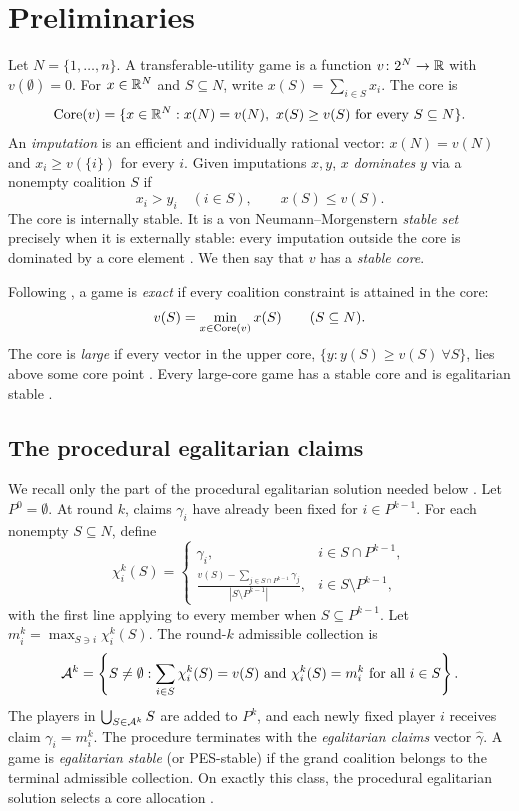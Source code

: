 \section{Preliminaries}\label{sec:prelim}

Let $N=\{1,\dots,n\}$. A transferable-utility game is a function
$v\colon 2^N\to\mathbb{R}$ with $v(\emptyset)=0$. For $x\in\mathbb{R}^N$ and $S\subseteq N$,
write $x(S)=\sum_{i\in S}x_i$. The core is
\[
 \operatorname{Core}(v)=
 \{x\in\mathbb{R}^N:x(N)=v(N),\ x(S)\ge v(S)\text{ for every }S\subseteq N\}.
\]
An \emph{imputation} is an efficient and individually rational vector:
$x(N)=v(N)$ and $x_i\ge v(\{i\})$ for every $i$. Given imputations $x,y$,
$x$ \emph{dominates} $y$ via a nonempty coalition $S$ if
\[
 x_i>y_i\quad(i\in S),\qquad x(S)\le v(S).
\]
The core is internally stable. It is a von Neumann--Morgenstern
\emph{stable set} precisely when it is externally stable: every imputation
outside the core is dominated by a core element \citep{vNM1944}. We then say
that $v$ has a \emph{stable core}.

Following \citet{Schmeidler1972}, a game is \emph{exact} if every coalition
constraint is attained in the core:
\[
 v(S)=\min_{x\in\operatorname{Core}(v)}x(S)\qquad(S\subseteq N).
\]
The core is \emph{large} if every vector in the upper core,
$\{y:y(S)\ge v(S)\ \forall S\}$, lies above some core point
\citep{Sharkey1982}. Every large-core game has a stable core and is
egalitarian stable \citep{Sharkey1982,Dietzenbacher2021}.

\subsection{The procedural egalitarian claims}

We recall only the part of the procedural egalitarian solution needed below
\citep{DBH2017,Dietzenbacher2021}. Let $P^0=\emptyset$. At round $k$, claims
$\gamma_i$ have already been fixed for $i\in P^{k-1}$. For each nonempty
$S\subseteq N$, define
\[
 \chi_i^k(S)=
 \begin{cases}
  \gamma_i,
    &i\in S\cap P^{k-1},\\[3pt]
  \displaystyle
  \frac{v(S)-\sum_{j\in S\cap P^{k-1}}\gamma_j}
       {|S\setminus P^{k-1}|},
    &i\in S\setminus P^{k-1},
 \end{cases}
\]
with the first line applying to every member when $S\subseteq P^{k-1}$.
Let $m_i^k=\max_{S\ni i}\chi_i^k(S)$. The round-$k$ admissible collection is
\[
 {\cal A}^k=
 \left\{S\ne\emptyset:
   \sum_{i\in S}\chi_i^k(S)=v(S)
   \text{ and }\chi_i^k(S)=m_i^k\text{ for all }i\in S
 \right\}.
\]
The players in $\bigcup_{S\in{\cal A}^k}S$ are added to $P^k$, and each newly
fixed player $i$ receives claim $\gamma_i=m_i^k$. The procedure terminates
with the \emph{egalitarian claims} vector $\widehat\gamma$. A game is
\emph{egalitarian stable} (or PES-stable) if the grand coalition belongs to
the terminal admissible collection. On exactly this class, the procedural
egalitarian solution selects a core allocation \citep{Dietzenbacher2021}.

